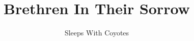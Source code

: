 \documentclass[ebook,12pt,oneside,onecolumn,openright,showtrim]{memoir}
\title{Brethren In Their Sorrow}
\author{Sleeps With Coyotes}
\date{}
\begin{document}
\frontmatter
\begin{titlingpage}
\setlength{\droptitle}{80pt}
\maketitle
\end{titlingpage}
\mainmatter
\pagestyle{plain}




\backmatter
\end{document}
